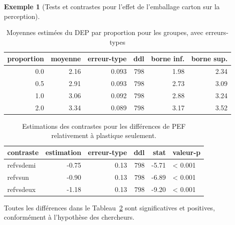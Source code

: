 \documentclass[
  11pt,
  letterpaper,
]{scrbook}
\theoremstyle{definition}
\newtheorem{example}{Exemple}[chapter]
\theoremstyle{plain}
\theoremstyle{definition}
\theoremstyle{plain}
\theoremstyle{remark}
\begin{document}
\begin{example}[Tests et contrastes pour l'effet de l'emballage carton
sur la
perception]
\begin{longtable}[t]{rrrrrr}

\caption{\label{tbl-print-groupmeans-PEF}Moyennes estimées du DEP par
proportion pour les groupes, avec erreurs-types}

\tabularnewline

\toprule
proportion & moyenne & erreur-type & ddl & borne inf. & borne sup.\\
\midrule
0.0 & 2.16 & 0.093 & 798 & 1.98 & 2.34\\
0.5 & 2.91 & 0.093 & 798 & 2.73 & 3.09\\
1.0 & 3.06 & 0.092 & 798 & 2.88 & 3.24\\
2.0 & 3.34 & 0.089 & 798 & 3.17 & 3.52\\
\bottomrule

\end{longtable}

\begin{longtable}[t]{lrrrrl}

\caption{\label{tbl-print-contrast-PEF}Estimations des contrastes pour
les différences de PEF relativement à plastique seulement.}

\tabularnewline

\toprule
contraste & estimation & erreur-type & ddl & stat & valeur-p\\
\midrule
refvsdemi & -0.75 & 0.13 & 798 & -5.71 & < 0.001\\
refvsun & -0.90 & 0.13 & 798 & -6.89 & < 0.001\\
refvsdeux & -1.18 & 0.13 & 798 & -9.20 & < 0.001\\
\bottomrule

\end{longtable}

Toutes les différences dans le Tableau~\ref{tbl-print-contrast-PEF} sont
significatives et positives, conformément à l'hypothèse des chercheurs.

\end{example}
\end{document}
